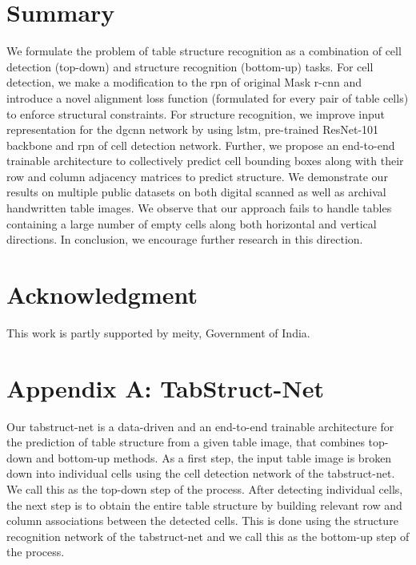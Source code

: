 \documentclass[runningheads]{llncs}
\begin{document}
\section{Summary} \label{conclusion}

We formulate the problem of table structure recognition as a combination of cell detection (top-down) and structure recognition (bottom-up) tasks. For cell detection, we make a modification to the {\sc rpn} of original Mask {\sc r-cnn} and introduce a novel alignment loss function (formulated for every pair of table cells) to enforce structural constraints. For structure recognition, we improve input representation for the {\sc dgcnn} network by using {\sc lstm}, pre-trained ResNet-101 backbone and {\sc rpn} of cell detection network. Further, we propose an end-to-end trainable architecture to collectively predict cell bounding boxes along with their row and column adjacency matrices to predict structure. We demonstrate our results on multiple public datasets on both digital scanned as well as archival handwritten table images. We observe that our approach fails to handle tables containing a large number of empty cells along both horizontal and vertical directions. In conclusion, we encourage further research in this direction.

\section*{Acknowledgment}

This work is partly supported by {\sc meity}, Government of India.




\section*{Appendix A: TabStruct-Net}

Our {\sc t}ab{\sc s}truct-{\sc n}et is a data-driven and an end-to-end trainable architecture for the prediction of table structure from a given table image, that combines top-down and bottom-up methods. As a first step, the input table image is broken down into individual cells using the cell detection network of the {\sc t}ab{\sc s}truct-{\sc n}et. We call this as the top-down step of the process. After detecting individual cells, the next step is to obtain the entire table structure by building relevant row and column associations between the detected cells. This is done using the structure recognition network of the {\sc t}ab{\sc s}truct-{\sc n}et and we call this as the bottom-up step of the process.
\end{document}
